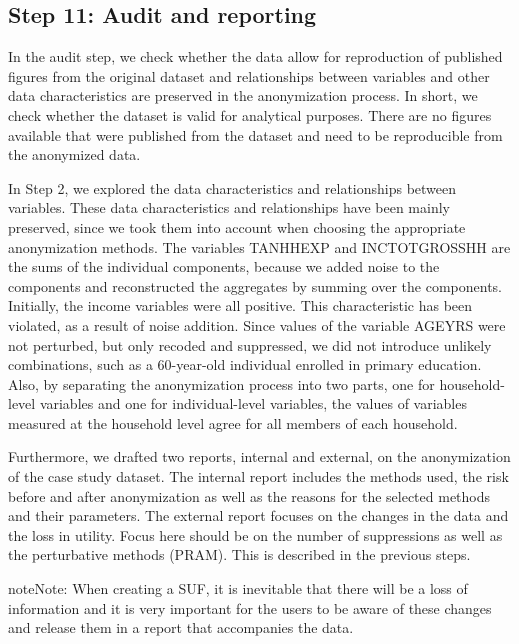 \documentclass[letterpaper,10pt,english]{sphinxmanual}
\begin{document}
\subsection{Step 11: Audit and reporting}
\label{\detokenize{casestudies:step-11-audit-and-reporting}}
In the audit step, we check whether the data allow for reproduction of
published figures from the original dataset and relationships between
variables and other data characteristics are preserved in the
anonymization process. In short, we check whether the dataset is valid
for analytical purposes. There are no figures available that were
published from the dataset and need to be reproducible from the
anonymized data.

In Step 2, we explored the data characteristics and relationships
between variables. These data characteristics and relationships have
been mainly preserved, since we took them into account when choosing the
appropriate anonymization methods. The variables TANHHEXP and
INCTOTGROSSHH are the sums of the individual components, because we
added noise to the components and reconstructed the aggregates by
summing over the components. Initially, the income variables were all
positive. This characteristic has been violated, as a result of noise
addition. Since values of the variable AGEYRS were not perturbed, but
only recoded and suppressed, we did not introduce unlikely combinations,
such as a 60-year-old individual enrolled in primary education. Also, by
separating the anonymization process into two parts, one for
household-level variables and one for individual-level variables, the
values of variables measured at the household level agree for all
members of each household.

Furthermore, we drafted two reports, internal and external, on the
anonymization of the case study dataset. The internal report includes
the methods used, the risk before and after anonymization as well as the
reasons for the selected methods and their parameters. The external
report focuses on the changes in the data and the loss in utility. Focus
here should be on the number of suppressions as well as the perturbative
methods (PRAM). This is described in the previous steps.

\begin{sphinxadmonition}{note}{Note:}
When creating a SUF, it is inevitable that there will be a loss of
information and it is very important for the users to be aware of these
changes and release them in a report that accompanies the data.
\end{sphinxadmonition}
\end{document}
